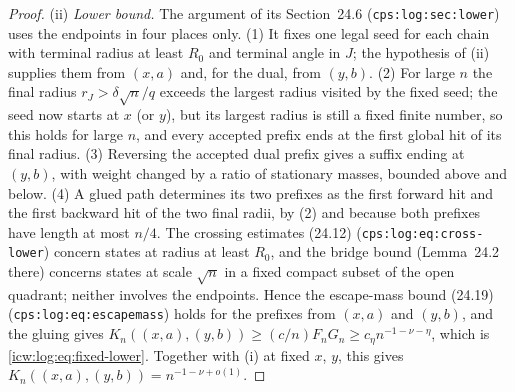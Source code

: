 \documentclass[11pt,letterpaper]{article}
\theoremstyle{remark}\newtheorem{remark}[theorem]{Remark}
\newcommand{\1}{\mathbf1}
\begin{document}
\begin{proof}
(ii) \emph{Lower bound.} The argument of its Section~24.6 (\texttt{cps:log:sec:lower}) uses the endpoints in four places only. (1) It fixes one legal seed for each chain with terminal radius at least $R_0$ and terminal angle in $J$; the hypothesis of (ii) supplies them from $(x,a)$ and, for the dual, from $(y,b)$. (2) For large $n$ the final radius $r_J>\delta\sqrt n/q$ exceeds the largest radius visited by the fixed seed; the seed now starts at $x$ (or $y$), but its largest radius is still a fixed finite number, so this holds for large $n$, and every accepted prefix ends at the first global hit of its final radius. (3) Reversing the accepted dual prefix gives a suffix ending at $(y,b)$, with weight changed by a ratio of stationary masses, bounded above and below. (4) A glued path determines its two prefixes as the first forward hit and the first backward hit of the two final radii, by (2) and because both prefixes have length at most $n/4$. The crossing estimates (24.12) (\texttt{cps:log:eq:cross-lower}) concern states at radius at least $R_0$, and the bridge bound (Lemma~24.2 there) concerns states at scale $\sqrt n$ in a fixed compact subset of the open quadrant; neither involves the endpoints. Hence the escape-mass bound (24.19) (\texttt{cps:log:eq:escapemass}) holds for the prefixes from $(x,a)$ and $(y,b)$, and the gluing gives $K_n((x,a),(y,b))\ge(c/n)F_nG_n\ge c_\eta n^{-1-\nu-\eta}$, which is \eqref{icw:log:eq:fixed-lower}. Together with (i) at fixed $x$, $y$, this gives $K_n((x,a),(y,b))=n^{-1-\nu+o(1)}$.
\end{proof}
\end{document}
